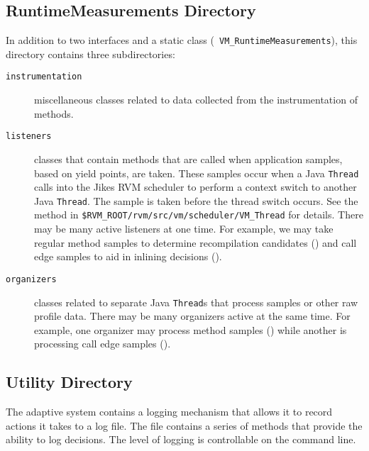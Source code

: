 \subsection{RuntimeMeasurements Directory}
In addition to two interfaces and a static class ({\tt
VM\_RuntimeMeasurements}),
this directory contains three subdirectories:
\begin{description}
\item[\texttt{instrumentation}] miscellaneous classes related to
data collected from the instrumentation of methods.  

\item[\texttt{listeners}] classes that contain methods that 
are called when application samples,
based on yield points, are taken.  These samples occur when a Java
{\tt Thread} calls into the Jikes RVM scheduler to perform a context switch
to another Java {\tt Thread}.  The sample is taken before the thread switch occurs.
See the 
 method in
{\tt \$RVM\_\-ROOT\-/\-rvm\-/\-src\-/\-vm\-/\-sche\-du\-ler\-/\-VM\_Thread} for details.
There may be many active listeners at one
time.  For example, we may take regular method samples to determine
recompilation candidates () and call edge 
samples to aid in inlining decisions ().  

\item[\texttt{organizers}]  classes related to separate Java {\tt Thread}s that
process samples or other raw profile data.  There may be many
organizers active at the same time.
For example, one organizer may process method samples 
() while
another is processing 
call edge samples (). 
\end{description}

\subsection{Utility Directory}
\label{aos-logging}The adaptive system contains a logging mechanism that allows it to
record actions it takes to a log file.  The file  
contains a series of methods that provide the ability to log
decisions.  The level of logging is controllable on the command line.

